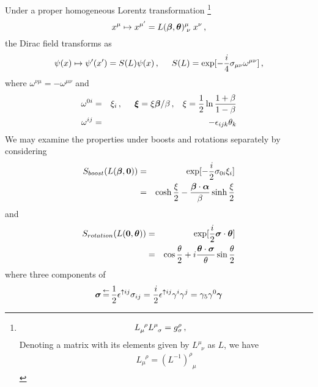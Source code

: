 Under a proper homogeneous Lorentz transformation
\footnote{%
\begin{eqnarray*}
L_\mu^{\;\;\rho} L^\mu_{\;\;\sigma} = g^\rho_\sigma\,,
\hspace{5mm}
\end{eqnarray*}
Denoting a matrix with its elements given by $L^\mu_{\;\;\nu}$ as $L$,
we have
\begin{eqnarray*}
L_\mu^{\;\;\rho} = (L^{-1})^\rho_{\;\;\mu}
\end{eqnarray*}
}%
\begin{equation}
x^\mu \mapsto x^{\mu'} = L(\mbox{\boldmath $\beta$}, \mbox{\boldmath $\theta$})^\mu_{\;\nu}\; x^\nu\,,
\end{equation}
the Dirac field transforms as
\begin{eqnarray}
\psi(x) \mapsto \psi'(x') = S(L) \psi(x)\,,
\hspace{5mm}
S(L) = \exp[ -\frac{i}{4}\sigma_{\mu \nu} \omega^{\mu \nu}]\,,
\end{eqnarray}
where $\omega^{\nu \mu} = -\omega^{\mu \nu}$ and
\begin{eqnarray}
\omega^{0i} &=& \xi_i\,,
\hspace{5mm}
\mbox{\boldmath $\xi$} = \xi \mbox{\boldmath $\beta$}/\beta\,,
\hspace{3mm}
\xi = \frac{1}{2} \ln \frac{1+\beta}{1-\beta}
\\
\omega^{ij}
&=&
-\epsilon_{ijk} \theta_k
\end{eqnarray}
We may examine the properties under boosts and rotations separately by considering
\begin{eqnarray}
S_{boost}(L(\mbox{\boldmath $\beta$},\mbox{\boldmath $0$})) &=& \exp[
-\frac{i}{2}\sigma_{0i}\xi_i ]
\\
&=&
\cosh \frac{\xi}{2} - \frac{\mbox{\boldmath $\beta$}\cdot \mbox{\boldmath $\alpha$}}{\beta} \sinh \frac{\xi}{2}
\end{eqnarray}
and
\begin{eqnarray}
S_{rotation}(L(\mbox{\boldmath $0$},\mbox{\boldmath $\theta$}))&=& \exp[
\frac{i}{2} \mbox{\boldmath $\sigma$}\cdot \mbox{\boldmath $\theta$} ]
\\
&=&
\cos \frac{\theta}{2}
+ i \frac{\mbox{\boldmath $\theta$}\cdot\mbox{\boldmath $\sigma$}}{\theta} \sin \frac{\theta}{2}
\end{eqnarray}
where three components of
\begin{eqnarray}
\mbox{\boldmath $\sigma$}  \,\mbox{$\stackrel{\leftarrow}{=}$}\, 
\frac{1}{2} \epsilon^{\uparrow ij}\sigma_{ij}
=
\frac{i}{2} \epsilon^{\uparrow ij} \gamma^i \gamma^j
=
\gamma_5 \gamma^0 \mbox{\boldmath $\gamma$}
\label{eqn:DiGenRotation}
\end{eqnarray}
